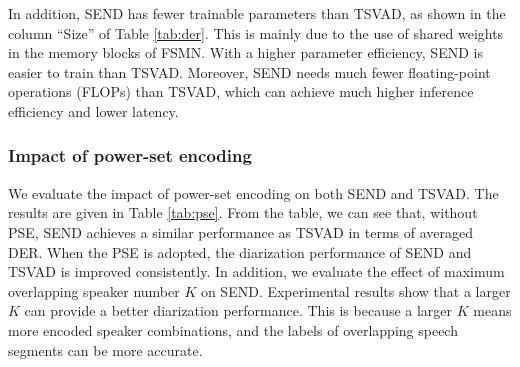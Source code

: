 \documentclass[a4paper]{article}
\begin{document}
In addition, SEND has fewer trainable parameters than TSVAD, as shown in the column ``Size'' of Table \ref{tab:der}. 
This is mainly due to the use of shared weights in the memory blocks of FSMN.
With a higher parameter efficiency, SEND is easier to train than TSVAD. 
Moreover, SEND needs much fewer floating-point operations (FLOPs) than TSVAD, which can achieve much higher inference efficiency and lower latency.
\subsubsection{Impact of power-set encoding}
We evaluate the impact of power-set encoding on both SEND and TSVAD. The results are given in Table \ref{tab:pse}.
From the table, we can see that, without PSE, SEND achieves a similar performance as TSVAD in terms of averaged DER.
When the PSE is adopted, the diarization performance of SEND and TSVAD is improved consistently.
In addition, we evaluate the effect of maximum overlapping speaker number $K$ on SEND.
Experimental results show that a larger $K$ can provide a better diarization performance.
This is because a larger $K$ means more encoded speaker combinations, and the labels of overlapping speech segments can be more accurate.

\begin{table}[t!]
	\caption{The impact of power-set encoding on different models in terms of DER(\%).}
	\label{tab:pse}
	\centering
\end{table}
\end{document}
